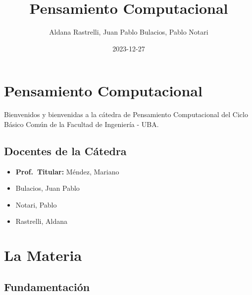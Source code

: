 \documentclass[
  letterpaper,
  DIV=11,
  numbers=noendperiod]{scrreprt}
\title{Pensamiento Computacional}
\author{Aldana Rastrelli, Juan Pablo Bulacios, Pablo Notari}
\date{2023-12-27}
\renewcommand*\contentsname{Table of contents}
\newcommand\contentsname{Table of contents}
\begin{document}
\maketitle

\renewcommand*\contentsname{Table of contents}
{
\hypersetup{linkcolor=}
\setcounter{tocdepth}{2}
\tableofcontents
}

\chapter*{Pensamiento Computacional}\label{pensamiento-computacional}


Bienvenidos y bienvenidas a la cátedra de Pensamiento Computacional del
Ciclo Básico Común de la Facultad de Ingeniería - UBA.

\section*{Docentes de la Cátedra}\label{docentes-de-la-cuxe1tedra}


\begin{itemize}
\item
  \textbf{Prof.~Titular:} Méndez, Mariano
\item
  Bulacios, Juan Pablo
\item
  Notari, Pablo
\item
  Rastrelli, Aldana
\end{itemize}


\chapter*{La Materia}\label{la-materia}


\section*{Fundamentación}\label{fundamentaciuxf3n}

\end{document}
